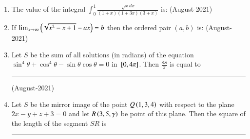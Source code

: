 \documentclass[journal]{IEEEtran}
\begin{document}
\begin{enumerate}
\begin{enumerate}
    \end{enumerate}
    \item The value of the integral $\int_0^1 \frac{\sqrt{x}dx}{(1+x)(1+3x)(3+x)}$ is: \hfill (August-2021)
    \begin{enumerate}
    \end{enumerate}
    \item If $\lim_{x\to\infty} \left(\sqrt{x^2 - x + 1} - ax\right) = b $ 
      then the ordered pair $(a,b)$ is: \hfill (August-2021)
    \begin{enumerate}
    \end{enumerate}
    \item Let $S$ be the sum of all solutions (in radians) of the equation $\sin^4\theta + \cos ^4 \theta - \sin \theta \cos \theta = 0$ in ${}\left[0, 4\pi\right]$. Then $\frac{8S}{\pi}$ is equal to \rule{1cm}{0.15mm}
    
    \hfill (August-2021)
    
    \item Let $S$ be the mirror image of the point $Q\left(1,3,4\right)$ with respect to the plane $2x - y + z + 3 = 0$ and let $R\left(3,5,\gamma\right) $ be point of this plane. Then the square of the length of the segment $SR$ is \rule{1cm}{0.15mm} 
    

\end{enumerate}
\end{document}
